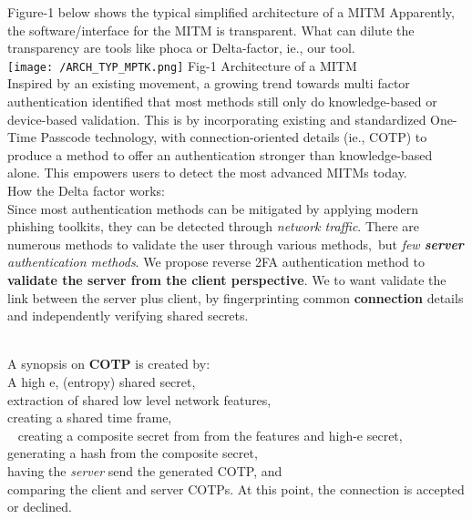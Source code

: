 \documentclass[a4paper, 11pt]{ article}
\begin{document}
\noindent
Figure-1 below shows the typical simplified architecture of a MITM 
Apparently, the software/interface for the MITM is transparent. What can dilute the transparency are tools like phoca or Delta-factor, ie., our tool.\\

\noindent %
\texttt{[image: /ARCH\_TYP\_MPTK.png]}
Fig-1 Architecture of a MITM\\ 

\noindent Inspired by an existing movement, a growing trend towards multi factor authentication
identified that most methods still only do knowledge-based or device-based validation.
This is by incorporating existing and standardized One-Time Passcode technology, with connection-oriented details (ie., COTP)
to produce a method to offer an authentication stronger than knowledge-based alone. This empowers users to detect the most advanced MITMs today.\\

\noindent
How the Delta factor works:\\
Since most authentication methods can be mitigated by applying modern phishing toolkits,
they can be detected through \textit{network traffic}.
There are numerous methods to validate the user through various methods, but \textit{few \textbf{server} authentication methods}.
We propose reverse 2FA authentication method to \textbf{validate the server from the client perspective}.
We to want validate the link between the server plus client, by fingerprinting common \textbf{connection} details and independently verifying shared secrets.\\ 


\noindent
A synopsis on \textbf{COTP} is created by:\\
\noindent
A high e, (entropy) shared secret,\\
extraction of shared low level network features,\\
creating a shared time frame,\\ 
creating a composite secret from from the features and high-e secret,\\
generating a hash from the composite secret,\\
having the \textit{server} send the generated COTP, and\\
comparing the client and server COTPs. At this point, the connection is accepted or declined.\\
\end{document}
